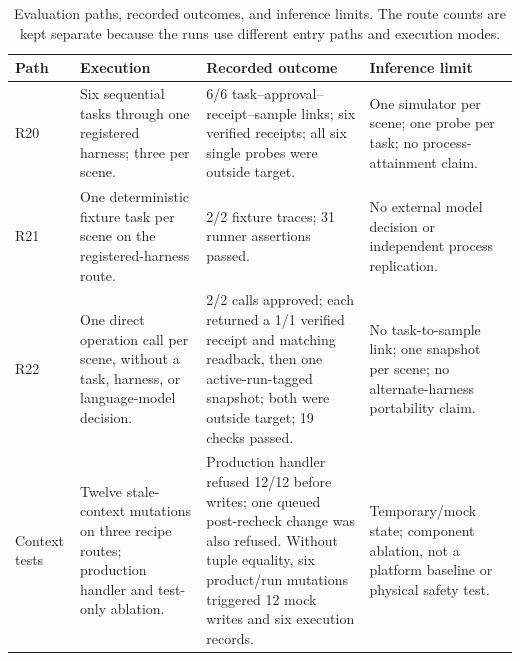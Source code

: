 \begin{table}[!t]
\centering
\caption{Evaluation paths, recorded outcomes, and inference limits. The route
counts are kept separate because the runs use different entry paths and
execution modes.}
\label{tab:routes}
\footnotesize
\setlength{\tabcolsep}{3pt}
\begin{tabularx}{\textwidth}{@{}p{1.25cm}p{3.4cm}X p{4.0cm}@{}}
\toprule
Path & Execution & Recorded outcome & Inference limit \\
\midrule
R20 & Six sequential tasks through one registered harness; three per scene. & 6/6 task--approval--receipt--sample links; six verified receipts; all six single probes were outside target. & One simulator per scene; one probe per task; no process-attainment claim. \\
R21 & One deterministic fixture task per scene on the registered-harness route. & 2/2 fixture traces; 31 runner assertions passed. & No external model decision or independent process replication. \\
R22 & One direct operation call per scene, without a task, harness, or language-model decision. & 2/2 calls approved; each returned a 1/1 verified receipt and matching readback, then one active-run-tagged snapshot; both were outside target; 19 checks passed. & No task-to-sample link; one snapshot per scene; no alternate-harness portability claim. \\
Context tests & Twelve stale-context mutations on three recipe routes; production handler and test-only ablation. & Production handler refused 12/12 before writes; one queued post-recheck change was also refused. Without tuple equality, six product/run mutations triggered 12 mock writes and six execution records. & Temporary/mock state; component ablation, not a platform baseline or physical safety test. \\
\bottomrule
\end{tabularx}
\end{table}

